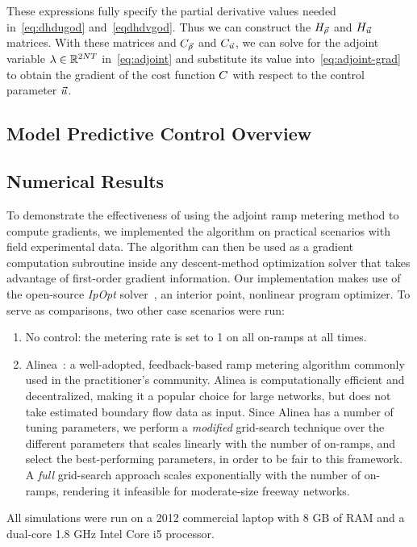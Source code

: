 These expressions fully specify the partial derivative values needed
in~\eqref{eq:dhdugod} and~\eqref{eqdhdvgod}. Thus we can construct
the $H_{\vec{\rho}}$ and $H_{\vec{u}}$ matrices. With these matrices and $C_{\vec{\rho}}$ and
$C_{\vec{u}}$, we can solve for the adjoint variable $\lambda\in\mathbb{R}^{2NT}$
in~\eqref{eq:adjoint} and substitute its value into~\eqref{eq:adjoint-grad}
to obtain the gradient of the cost function $C$ with respect
to the control parameter $\vec{u}$.

\subsection{Model Predictive Control Overview}
\label{sec:model-predictive-control-overview-adjoint-section}



\subsection{Numerical Results}
\label{sec:numerical-results-adjoint}

To demonstrate the effectiveness of using the adjoint ramp metering
method to compute gradients, we implemented the algorithm on practical scenarios with field experimental data.
The algorithm can then be used as a gradient computation subroutine
inside any descent-method optimization solver that takes advantage
of first-order gradient information. Our implementation makes use
of the open-source \emph{IpOpt} solver~\cite{Andreas2005}, an interior point, nonlinear program optimizer. To serve
as comparisons, two other case scenarios were run:
\begin{enumerate}
\item No control: the metering rate is set to 1 on all on-ramps at all times.
\item Alinea~\cite{Papageorgiou1991}: a well-adopted, feedback-based ramp metering
algorithm commonly used in the practitioner's community. Alinea is computationally efficient and decentralized,
making it a popular choice for large networks, but does not take estimated
boundary flow data as input. Since Alinea has a number of tuning parameters,
we perform a \emph{modified} grid-search technique over the different
parameters that scales linearly with the number of on-ramps, and select
the best-performing parameters, in order to be fair to this framework. A \emph{full} grid-search approach
scales exponentially with the number of on-ramps, rendering it infeasible
for moderate-size freeway networks.
\end{enumerate}
All simulations were run on a 2012 commercial laptop with 8 GB of RAM and a dual-core 1.8 GHz Intel Core i5 processor.

